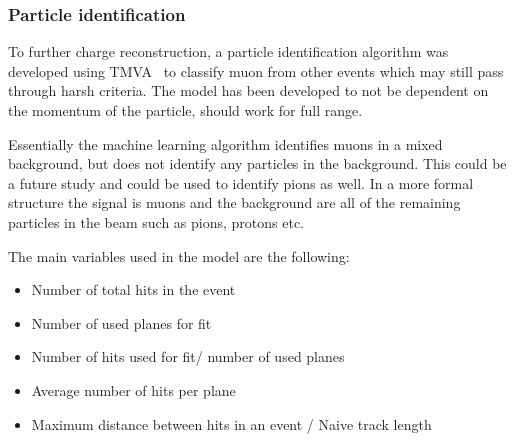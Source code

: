 






\clearpage
\subsubsection{Particle identification}
To further charge reconstruction, a  particle identification algorithm was developed using TMVA~\cite{TMVA} to classify muon from other events which may still pass through harsh criteria. The model has been developed to not be dependent on the momentum of the particle, should work for full range.

Essentially the machine learning algorithm identifies muons in a mixed background, but does not identify any particles in the background. This could be a future study and could be used to identify pions as well. In a more formal structure the signal is muons and the background are all of the remaining particles in the beam such as pions, protons etc.

The main variables used in the model are the following:
\begin{itemize}
\item Number of total hits in the event
\item Number of used planes for fit
\item Number of hits used for fit/ number of used planes
\item Average number of hits per plane
\item Maximum distance between hits in an event / Naive track length
\end{itemize}

